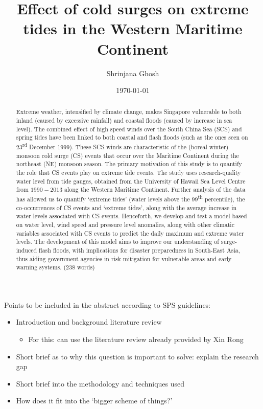 \documentclass[12pt]{article}
\begin{document}
\title{\vspace{-2.0cm}Effect of cold surges on extreme tides in the Western Maritime Continent}
\author{Shrinjana Ghosh}
\date{\today}
\vfill





\maketitle

\begin{abstract}
    Extreme weather, intensified by climate change, makes Singapore vulnerable to both inland (caused by excessive rainfall) and coastal floods
    (caused by increase in sea level). The combined effect of high speed winds over the South China Sea (SCS) and spring tides have been linked to 
    both coastal and flash floods (such as the ones seen on 23\textsuperscript{rd} December 1999).
    These SCS winds are characteristic of the (boreal winter) monsoon cold surge (CS) events that 
    occur over the Maritime Continent during the northeast (NE) monsoon season. The primary motivation of this study is to quantify the role that CS events
    play on extreme tide events. The study uses research-quality water level from tide gauges, obtained from
    the University of Hawaii Sea Level Centre from $1990-2013$ along the 
    Western Maritime Continent. Further analysis of the data has allowed us to quantify `extreme tides' (water levels above the 99\textsuperscript{th} percentile), 
    the co-occurrences of CS events and `extreme tides', along with the
    average increase in water levels associated with CS events. Henceforth, we develop and test a model based on
    water level, wind speed and pressure level anomalies, along with other climatic variables associated with CS events to predict the daily maximum and extreme water levels. 
    The development of this model aims to improve our understanding of surge-induced flash floods, with implications for disaster preparedness in South-East Asia, thus aiding
    government agencies in risk mitigation for vulnerable areas and early warning systems.
    \newline (238 words)
\end{abstract}



\begin{paragraph}
    \noindent Points to be included in the abstract according to SPS guidelines: 
\begin{itemize}
    \item Introduction and background literature review
    \begin{itemize}
        \item For this: can use the literature review already provided by Xin Rong
    \end{itemize}
    \item Short brief as to why this question is important to solve: explain the research gap 
    \item Short brief into the methodology and techniques used 
    \item How does it fit into the `bigger scheme of things?'
\end{itemize}
\end{paragraph} 
\end{document}
